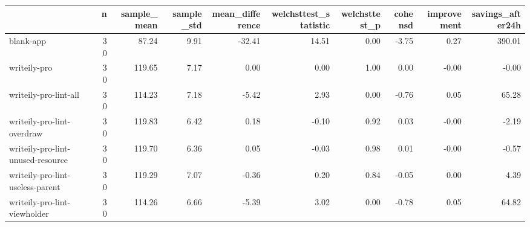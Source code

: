 \begin{tabular}{lrrrrrrrrr}
\toprule
{} &   n &  sample\_mean &  sample\_std &  mean\_difference &  welchsttest\_statistic &  welchsttest\_p &  cohensd &  improvement &  savings\_after24h \\
\midrule
blank-app                         &  30 &        87.24 &        9.91 &           -32.41 &                  14.51 &           0.00 &    -3.75 &         0.27 &            390.01 \\
writeily-pro                      &  30 &       119.65 &        7.17 &             0.00 &                   0.00 &           1.00 &     0.00 &        -0.00 &             -0.00 \\
writeily-pro-lint-all             &  30 &       114.23 &        7.18 &            -5.42 &                   2.93 &           0.00 &    -0.76 &         0.05 &             65.28 \\
writeily-pro-lint-overdraw        &  30 &       119.83 &        6.42 &             0.18 &                  -0.10 &           0.92 &     0.03 &        -0.00 &             -2.19 \\
writeily-pro-lint-unused-resource &  30 &       119.70 &        6.36 &             0.05 &                  -0.03 &           0.98 &     0.01 &        -0.00 &             -0.57 \\
writeily-pro-lint-useless-parent  &  30 &       119.29 &        7.07 &            -0.36 &                   0.20 &           0.84 &    -0.05 &         0.00 &              4.39 \\
writeily-pro-lint-viewholder      &  30 &       114.26 &        6.66 &            -5.39 &                   3.02 &           0.00 &    -0.78 &         0.05 &             64.82 \\
\bottomrule
\end{tabular}
